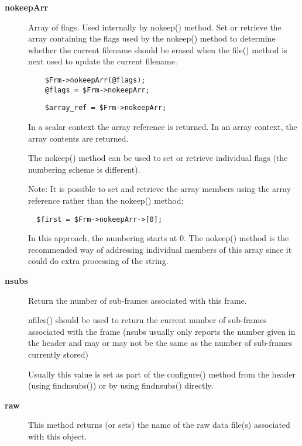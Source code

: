\begin{description}
\item[\textbf{nokeepArr}] \mbox{}

Array of flags. Used internally by nokeep() method.  Set or retrieve
the array containing the flags used by the nokeep() method to
determine whether the current filename should be erased when the
file() method is next used to update the current filename.

\begin{verbatim}
    $Frm->nokeepArr(@flags);
    @flags = $Frm->nokeepArr;
\end{verbatim}
\begin{verbatim}
    $array_ref = $Frm->nokeepArr;
\end{verbatim}


In a scalar context the array reference is returned.
In an array context, the array contents are returned.



The nokeep() method can be used to set or retrieve individual
flags (the numbering scheme is different).



Note: It is possible to set and retrieve the array members using
the array reference rather than the nokeep() method:

\begin{verbatim}
  $first = $Frm->nokeepArr->[0];
\end{verbatim}


In this approach, the numbering starts at 0. The nokeep() method
is the recommended way of addressing individual members of this
array since it could do extra processing of the
string.


\item[\textbf{nsubs}] \mbox{}

Return the number of sub-frames associated with this frame.



nfiles() should be used to return the current number of sub-frames
associated with the frame (nsubs usually only reports the number given
in the header and may or may not be the same as the number of sub-frames
currently stored)



Usually this value is set as part of the configure() method from
the header (using findnsubs()) or by using findnsubs() directly.


\item[\textbf{raw}] \mbox{}

This method returns (or sets) the name of the raw data file(s)
associated with this object.


\end{description}
